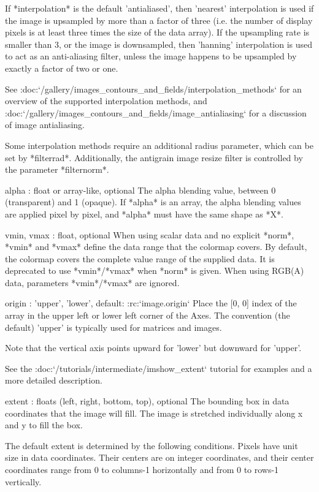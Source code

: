 \begin{DoxyVerb}
\begin{DoxyVerb}
    If *interpolation* is the default 'antialiased', then 'nearest'
    interpolation is used if the image is upsampled by more than a
    factor of three (i.e. the number of display pixels is at least
    three times the size of the data array).  If the upsampling rate is
    smaller than 3, or the image is downsampled, then 'hanning'
    interpolation is used to act as an anti-aliasing filter, unless the
    image happens to be upsampled by exactly a factor of two or one.

    See
    :doc:`/gallery/images_contours_and_fields/interpolation_methods`
    for an overview of the supported interpolation methods, and
    :doc:`/gallery/images_contours_and_fields/image_antialiasing` for
    a discussion of image antialiasing.

    Some interpolation methods require an additional radius parameter,
    which can be set by *filterrad*. Additionally, the antigrain image
    resize filter is controlled by the parameter *filternorm*.

alpha : float or array-like, optional
    The alpha blending value, between 0 (transparent) and 1 (opaque).
    If *alpha* is an array, the alpha blending values are applied pixel
    by pixel, and *alpha* must have the same shape as *X*.

vmin, vmax : float, optional
    When using scalar data and no explicit *norm*, *vmin* and *vmax*
    define the data range that the colormap covers. By default,
    the colormap covers the complete value range of the supplied
    data. It is deprecated to use *vmin*/*vmax* when *norm* is given.
    When using RGB(A) data, parameters *vmin*/*vmax* are ignored.

origin : {'upper', 'lower'}, default: :rc:`image.origin`
    Place the [0, 0] index of the array in the upper left or lower
    left corner of the Axes. The convention (the default) 'upper' is
    typically used for matrices and images.

    Note that the vertical axis points upward for 'lower'
    but downward for 'upper'.

    See the :doc:`/tutorials/intermediate/imshow_extent` tutorial for
    examples and a more detailed description.

extent : floats (left, right, bottom, top), optional
    The bounding box in data coordinates that the image will fill.
    The image is stretched individually along x and y to fill the box.

    The default extent is determined by the following conditions.
    Pixels have unit size in data coordinates. Their centers are on
    integer coordinates, and their center coordinates range from 0 to
    columns-1 horizontally and from 0 to rows-1 vertically.


\end{DoxyVerb}
\end{DoxyVerb}
